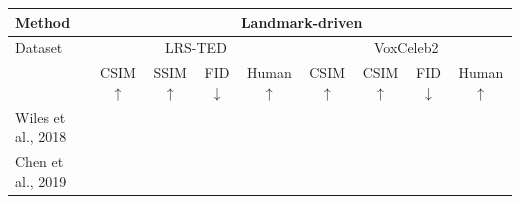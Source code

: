 \documentclass[runningheads]{llncs}
\begin{document}
\begin{table}[t]
    \centering
    \scriptsize
    \begin{tabular*}{0.98\linewidth}{  l | c c  c c| c c c c }
      \toprule
      \hline
 Method & \multicolumn{8}{c}{Landmark-driven}   \\ \hline
Dataset & \multicolumn{4}{c}{LRS-TED} & \multicolumn{4}{c}{VoxCeleb2}  \\
&{{\scriptsize{CSIM}}$\uparrow$}& {{\scriptsize{SSIM}}$\uparrow$} & 
{{\scriptsize{FID}}$\downarrow$} & {{\scriptsize{Human}}$\uparrow$} &{{\scriptsize{CSIM}}$\uparrow$}  %
& {{\scriptsize{CSIM}}$\uparrow$}&{{\scriptsize{FID}}$\downarrow$} & {{\scriptsize{Human}}$\uparrow$}   \\
{{\scriptsize{Wiles et al., 2018}~\cite{wiles2018x2face}}} &  &      &  &    &   &  \\ %

{{\scriptsize{Chen et al., 2019}~\cite{chen2019hierarchical}}}&  &  & \textbf{  } &   &       &   \\   %


\end{tabular*}
\end{table}
\end{document}

